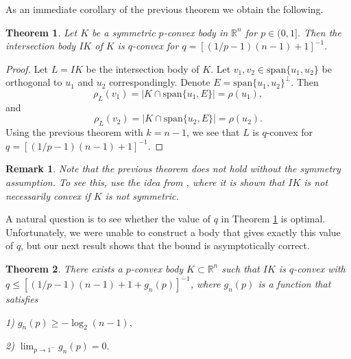 \documentclass[12pt]{amsart} %
\newtheorem{theorem}{Theorem}
\newtheorem{remark}{Remark}
\renewcommand{\[}{\left[}
\renewcommand{\(}{\left(}
\renewcommand{\]}{\right]}
\renewcommand{\)}{\right)}
\renewcommand{\le}{\leqslant}
\renewcommand{\ge}{\geqslant}
\newcommand{\R}{\mathbb R}              %
\begin{document}
As an immediate corollary of the previous theorem we obtain the following.

\begin{theorem}\label{th:q-conv}
Let $K$ be a symmetric $p$-convex body in $\R^n$ for $p \in (0,1]$. Then the
intersection body $IK$ of $K$ is $q$-convex for   $q = \left[
\left(1/p-1\right)(n-1) + 1 \right]^{-1}$.
\end{theorem}
\begin{proof}
Let $L=IK$ be the intersection body of $K$. Let $v_1,v_2\in \mbox{span}\{u_1,u_2\}$ be orthogonal to $u_1$ and $u_2$ correspondingly. Denote $E=\mbox{span}\{u_1,u_2\}^\perp$.
Then $$\rho_L(v_1) =  |K \cap \mbox{span}\{u_1,E\}| = \rho (u_1),$$
and $$\rho_L(v_2) =  |K \cap \mbox{span}\{u_2,E\}| = \rho (u_2).$$
Using the previous theorem with $k=n-1$, we see that $L$ is $q$-convex for   $q =  [
\left(1/p-1\right)(n-1) + 1 ]^{-1}$.
\end{proof}


\begin{remark}
Note that the previous theorem does not hold without the symmetry assumption. To see this, use the idea from \cite[Thm 8.1.8]{Ga2}, where it is shown that $IK$ is not necessarily convex if $K$ is not symmetric.
\end{remark}


A natural question is to see whether the value of $q$ in Theorem \ref{th:q-conv} is optimal. Unfortunately, we were unable to construct a body that gives exactly this value of $q$, but our next result shows that the bound is asymptotically correct.

\begin{theorem}

There exists a $p$-convex body $K\subset \mathbb R^n$ such that $IK$ is $q$-convex with $q\le \left[(1/p-1)(n-1)+1 +g_n(p)\right]^{-1}$, where $g_n(p)$ is  a function that satisfies

1) $g_n(p)\ge  - \log_2(n-1),$

2) $\displaystyle \lim_{p\to 1^-} g_n(p) =0 .$


\end{theorem}
\end{document}
